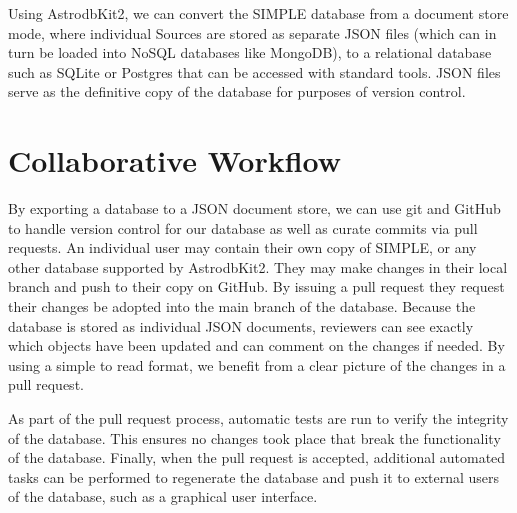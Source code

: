 \documentclass[11pt,twoside]{article}
\begin{document}
Using AstrodbKit2, we can convert the SIMPLE database from a document store mode, where individual Sources are stored as separate JSON files (which can in turn be loaded into NoSQL databases like MongoDB), to a relational database such as SQLite or Postgres that can be accessed with standard tools. JSON files serve as the definitive copy of the database for purposes of version control.

\section{Collaborative Workflow}

By exporting a database to a JSON document store, we can use git and GitHub to handle version control for our database as well as curate commits via pull requests. 
An individual user may contain their own copy of SIMPLE, or any other database supported by AstrodbKit2. They may make changes in their local branch and push to their copy on GitHub. By issuing a pull request they request their changes be adopted into the main branch of the database. Because the database is stored as individual JSON documents, reviewers can see exactly which objects have been updated and can comment on the changes if needed. By using a simple to read format, we benefit from a clear picture of the changes in a pull request. 

As part of the pull request process, automatic tests are run to verify the integrity of the database. This ensures no changes took place that break the functionality of the database. Finally, when the pull request is accepted, additional automated tasks can be performed to regenerate the database and push it to external users of the database, such as a graphical user interface.



% 


\end{document}
